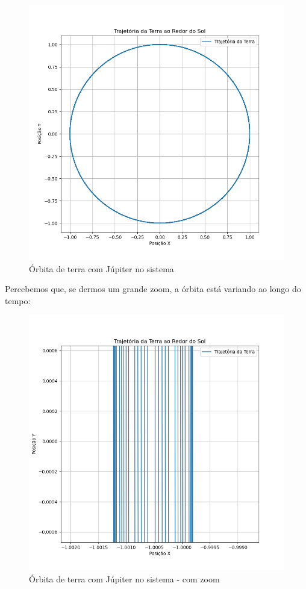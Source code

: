 \documentclass[12pt,a4paper]{article}
\begin{document}
\begin{figure}[H]
\centering
\includegraphics[width=\linewidth]{../tarefa-3/orbita1.png}
\caption{Órbita de terra com Júpiter no sistema}
\end{figure}

Percebemos que, se dermos um grande zoom, a órbita está variando ao longo do tempo:

\begin{figure}[H]
\centering
\includegraphics[width=\linewidth]{../tarefa-3/orbita2.png}
\caption{Órbita de terra com Júpiter no sistema - com zoom}
\end{figure}
\end{document}
